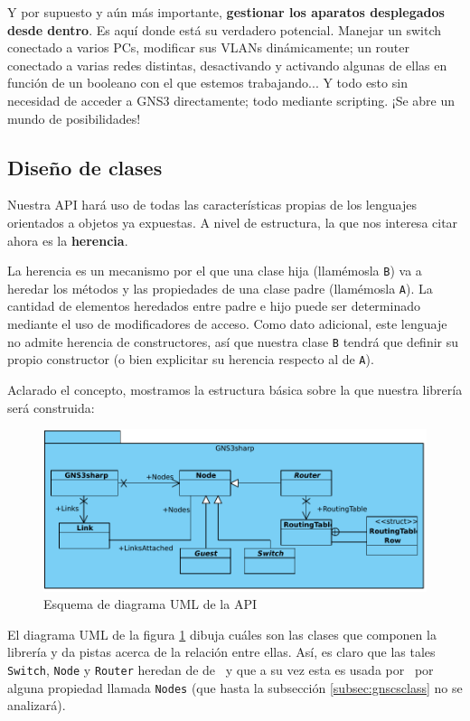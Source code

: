 Y por supuesto y aún más importante, \textbf{gestionar los aparatos desplegados desde dentro}. Es aquí donde está su verdadero potencial. Manejar un switch conectado a varios PCs, modificar sus VLANs dinámicamente; un router conectado a varias redes distintas, desactivando y activando algunas de ellas en función de un booleano con el que estemos trabajando... Y todo esto sin necesidad de acceder a GNS3 directamente; todo mediante scripting. ¡Se abre un mundo de posibilidades!

\subsection{Diseño de clases}
Nuestra API hará uso de todas las características propias de los lenguajes orientados a objetos ya expuestas. A nivel de estructura, la que nos interesa citar ahora es la \textbf{herencia}.

La herencia es un mecanismo por el que una clase hija (llamémosla \texttt{B}) va a heredar los métodos y las propiedades de una clase padre (llamémosla \texttt{A}). La cantidad de elementos heredados entre padre e hijo puede ser determinado mediante el uso de modificadores de acceso. Como dato adicional, este lenguaje no admite herencia de constructores, así que nuestra clase \texttt{B} tendrá que definir su propio constructor (o bien explicitar su herencia respecto al de \texttt{A}).

Aclarado el concepto, mostramos la estructura básica sobre la que nuestra librería será construida:

\begin{figure}[H]
  \centering
  \includegraphics[scale=0.75]{imagenes/diagrama_api1}
  \caption{Esquema de diagrama UML de la API}
  \label{fig:diagrama_api1}
\end{figure}

El diagrama UML de la figura \ref{fig:diagrama_api1} dibuja cuáles son las clases que componen la librería y da pistas acerca de la relación entre ellas. Así, es claro que las tales \texttt{Switch}, \texttt{Node} y \texttt{Router} heredan de de \NODE~y que a su vez esta es usada por \GNSCS~por alguna propiedad llamada \texttt{Nodes} (que hasta la subsección \ref{subsec:gnscsclass} no se analizará).

